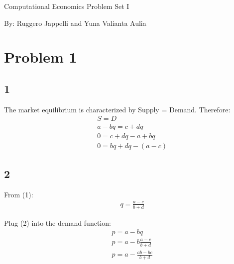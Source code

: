 \documentclass[12pt]{report}
\begin{document}
\begin{titlepage}
\begin{center}
\LARGE Computational Economics Problem Set I\\
\end{center}

\vskip 1in

\flushleft

By: Ruggero Jappelli and Yuna Valianta Aulia\\


\vskip 1in
\begin{center}

\end{center}
\end{titlepage}

\cleardoublepage
{}

\section*{Problem 1}
\subsection*{1}
\noindent
The market equilibrium is characterized by Supply = Demand. Therefore:
\begin{equation}
\begin{aligned}
& S = D\\
& a - bq = c + dq\\
& 0 = c + dq - a + bq\\
& 0 = bq + dq - (a - c)
\end{aligned}
\end{equation}

\subsection*{2}
From (1):
\begin{equation}
\begin{aligned}
& q = \frac{a - c}{b + d}
\end{aligned}
\end{equation}

Plug (2) into the demand function:
\begin{equation}
\begin{aligned}
& p = a - bq\\
& p = a - b \frac{a - c}{b + d}\\
& p = a - \frac{ab - bc}{b + d}
\end{aligned}
\end{equation}
\end{document}

